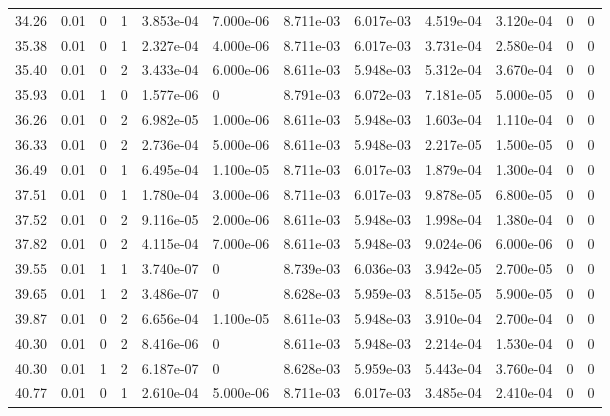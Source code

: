 \documentclass[preview]{standalone}
\begin{document}
{{{\begin{tabular}{L{1.2cm}C{1.2cm} C{0.3cm}C{0.5cm} C{1.4cm}C{1.4cm} C{1.4cm}C{1.4cm} C{1.6cm}C{1.6cm} C{1.6cm}C{1.6cm}}
  34.26  &  0.01  & 0     &  1 &  3.853e-04  & 7.000e-06  &  8.711e-03&   6.017e-03& 4.519e-04 & 3.120e-04   &  0 & 0  \\ 
  35.38  &  0.01  & 0     &  1 &  2.327e-04  & 4.000e-06  &  8.711e-03&   6.017e-03& 3.731e-04 & 2.580e-04   &  0 & 0  \\ 
  35.40  &  0.01  & 0     &  2 &  3.433e-04  & 6.000e-06  &  8.611e-03&   5.948e-03& 5.312e-04 & 3.670e-04   &  0 & 0  \\ 
  35.93  &  0.01  & 1     &  0 &  1.577e-06  & 0  &  8.791e-03&   6.072e-03& 7.181e-05 & 5.000e-05   &  0 & 0  \\ 
  36.26  &  0.01  & 0     &  2 &  6.982e-05  & 1.000e-06  &  8.611e-03&   5.948e-03& 1.603e-04 & 1.110e-04   &  0 & 0  \\ 
  36.33  &  0.01  & 0     &  2 &  2.736e-04  & 5.000e-06  &  8.611e-03&   5.948e-03& 2.217e-05 & 1.500e-05   &  0 & 0  \\ 
  36.49  &  0.01  & 0     &  1 &  6.495e-04  & 1.100e-05  &  8.711e-03&   6.017e-03& 1.879e-04 & 1.300e-04   &  0 & 0  \\ 
  37.51  &  0.01  & 0     &  1 &  1.780e-04  & 3.000e-06  &  8.711e-03&   6.017e-03& 9.878e-05 & 6.800e-05   &  0 & 0  \\ 
  37.52  &  0.01  & 0     &  2 &  9.116e-05  & 2.000e-06  &  8.611e-03&   5.948e-03& 1.998e-04 & 1.380e-04   &  0 & 0  \\ 
  37.82  &  0.01  & 0     &  2 &  4.115e-04  & 7.000e-06  &  8.611e-03&   5.948e-03& 9.024e-06 & 6.000e-06   &  0 & 0  \\ 
  39.55  &  0.01  & 1     &  1 &  3.740e-07  & 0  &  8.739e-03&   6.036e-03& 3.942e-05 & 2.700e-05   &  0 & 0  \\ 
  39.65  &  0.01  & 1     &  2 &  3.486e-07  & 0  &  8.628e-03&   5.959e-03& 8.515e-05 & 5.900e-05   &  0 & 0  \\ 
  39.87  &  0.01  & 0     &  2 &  6.656e-04  & 1.100e-05  &  8.611e-03&   5.948e-03& 3.910e-04 & 2.700e-04   &  0 & 0  \\ 
  40.30  &  0.01  & 0     &  2 &  8.416e-06  & 0  &  8.611e-03&   5.948e-03& 2.214e-04 & 1.530e-04   &  0 & 0  \\ 
  40.30  &  0.01  & 1     &  2 &  6.187e-07  & 0  &  8.628e-03&   5.959e-03& 5.443e-04 & 3.760e-04   &  0 & 0  \\ 
  40.77  &  0.01  & 0     &  1 &  2.610e-04  & 5.000e-06  &  8.711e-03&   6.017e-03& 3.485e-04 & 2.410e-04   &  0 & 0  \\ 
\hline 
\end{tabular} 

}}}
\end{document}
